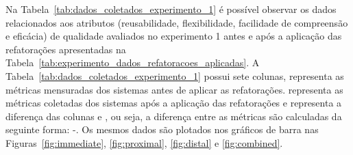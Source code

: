 Na Tabela~\ref{tab:dados_coletados_experimento_1} é possível observar os dados relacionados aos atributos (reusabilidade, flexibilidade, facilidade de compreensão e eficácia) de qualidade avaliados no experimento 1 antes e após a aplicação das refatorações apresentadas na Tabela~\ref{tab:experimento_dados_refatoracoes_aplicadas}. A Tabela~\ref{tab:dados_coletados_experimento_1} possui sete colunas,  representa as métricas mensuradas dos sistemas antes de aplicar as refatorações.  representa as métricas coletadas dos sistemas após a aplicação das refatorações e  representa a diferença das colunas  e , ou seja, a diferença entre as métricas são calculadas da seguinte forma: -. Os mesmos dados são plotados nos gráficos de barra nas Figuras~\ref{fig:immediate}, \ref{fig:proximal}, \ref{fig:distal} e \ref{fig:combined}. 


